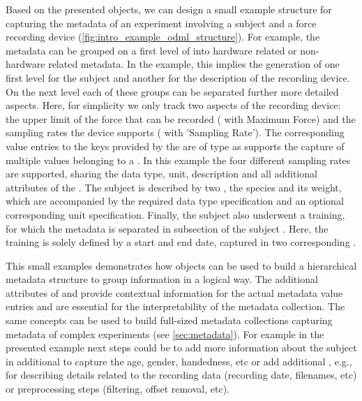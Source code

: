 Based on the presented  objects, we can design a small example structure for capturing the metadata of an experiment involving a subject and a force recording device (\cref{fig:intro_example_odml_structure}). For example, the metadata can be grouped on a first level of  into hardware related or non-hardware related metadata. In the example, this implies the generation of one first level  for the subject and another  for the description of the recording device. On the next level each of these groups can be separated further more detailed aspects. Here, for simplicity we only track two aspects of the recording device: the upper limit of the force that can be recorded ( with  Maximum Force) and the sampling rates the device supports ( with  'Sampling Rate'). The corresponding value entries to the keys provided by the  are of type  as  supports the capture of multiple values belonging to a . In this example the four different sampling rates are supported, sharing the data type, unit, description and all additional attributes of the . The subject is described by two , the species and its weight, which are accompanied by the required data type specification and an optional corresponding unit specification. Finally, the subject also underwent a training, for which the metadata is separated in subsection of the subject . Here, the training is solely defined by a start and end date, captured in two corresponding .

This small examples demonstrates how  objects can be used to build a hierarchical metadata structure to group information in a logical way. The additional attributes of  and  provide contextual information for the actual metadata value entries and are essential for the interpretability of the metadata collection. The same concepts can be used to build full-sized metadata collections capturing metadata of complex experiments (see \cref{sec:metadata}). For example in the presented example next steps could be to add more information about the subject in additional  to capture the age, gender, handedness, etc or add additional , e.g., for describing details related to the recording data (recording date, filenames, etc) or preprocessing steps (filtering, offset removal, etc).


